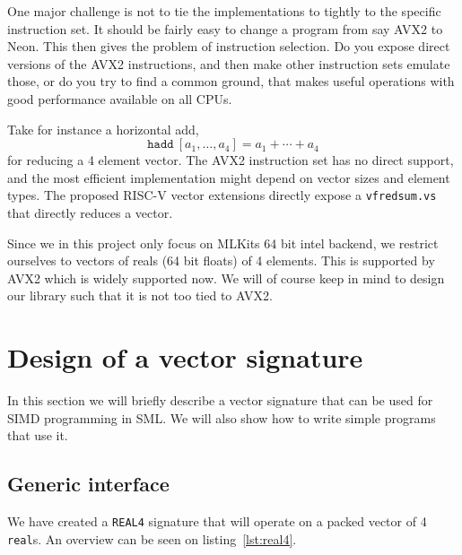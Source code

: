 \documentclass{article}
\begin{document}
One major challenge is not to tie the implementations to tightly to the specific instruction set. It should be fairly easy to change a program from say AVX2 to Neon. This then gives the problem of instruction selection. Do you expose direct versions of the AVX2 instructions, and then make other instruction sets emulate those, or do you try to find a common ground, that makes useful operations with good performance available on all CPUs.

Take for instance a horizontal add,
\[
    \mathtt{hadd}\ [a_1, \ldots, a_4] = a_1 + \cdots + a_4
\]
for reducing a 4 element vector. The AVX2 instruction set has no direct support, and the most efficient implementation might depend on vector sizes and element types. The proposed RISC-V vector extensions directly expose a \texttt{vfredsum.vs} that directly reduces a vector.

Since we in this project only focus on MLKits 64 bit intel backend, we restrict ourselves to vectors of reals (64 bit floats) of 4 elements. This is supported by AVX2 which is widely supported now. We will of course keep in mind to design our library such that it is not too tied to AVX2.

\section{Design of a vector signature}

In this section we will briefly describe a vector signature that can be used for SIMD programming in SML. We will also show how to write simple programs that use it.

\subsection{Generic interface}

We have created a \verb!REAL4! signature that will operate on a packed vector of 4 \verb!real!s. An overview can be seen on listing~\ref{lst:real4}.
\end{document}
